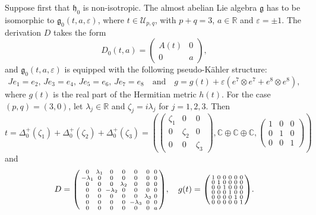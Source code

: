 \documentclass{article}
\theoremstyle{definition}
\newcommand{\R}{\mathbb{R}}
\newcommand{\C}{\mathbb{C}}
\newcommand{\frg}{\mathfrak{g}}
\newcommand{\frh}{\mathfrak{h}}
\newcommand{\lie}[1]{\mathfrak{#1}}
\newcommand{\g}{\lie g}
\newenvironment{smallpmatrix}{\left(\begin{smallmatrix}}{\end{smallmatrix}\right)}
\begin{document}
Suppose first that $\frh_0$ is non-isotropic. The almost abelian Lie algebra $\frg$ has to be isomorphic to $\g_0(t,a,\varepsilon)$, where $t\in\mathcal{U}_{p,q}$, with $p+q=3$, $a\in\R$ and $\varepsilon=\pm1$. The derivation $D$ takes the form $$D_0(t,a)=\begin{pmatrix}
    A(t)&0\\
    0&a
\end{pmatrix},$$ and $\frg_0(t,a,\varepsilon)$ is equipped with the following pseudo-Kähler structure: \begin{equation}\label{eqn:Jgnonisotropic8}
    Je_1=e_2,\,Je_3=e_4,\,Je_5=e_6,\,Je_7=e_8\quad\text{and}\quad g=g(t)+\varepsilon(e^7\otimes e^7+e^8\otimes e^8),
\end{equation} where $g(t)$ is the real part of the Hermitian metric $h(t)$. For the case $(p,q)=(3,0)$, let $\lambda_j\in\R$ and $\zeta_j=i\lambda_j$ for $j=1,2,3$. Then $$t=\Delta_0^+(\zeta_1)+\Delta_0^+(\zeta_2)+\Delta_0^+(\zeta_3)=\left(\begin{pmatrix}
    \zeta_1&0&0\\
    0&\zeta_2&0\\
    0&0&\zeta_3
\end{pmatrix},\C\oplus\C\oplus\C,\begin{pmatrix}
    1&0&0\\
    0&1&0\\
    0&0&1
\end{pmatrix}\right)$$ and \begin{equation}\label{8d_noniso_(3,0)}
    D=\begin{smallpmatrix}
        0 & \lambda_{1} & 0 & 0 & 0 & 0 & 0 \\
        -\lambda_{1} & 0 & 0 & 0 & 0 & 0 & 0 \\
        0 & 0 & 0 & \lambda_{2} & 0 & 0 & 0 \\
        0 & 0 & -\lambda_{2} & 0 & 0 & 0 & 0 \\
        0 & 0 & 0 & 0 & 0 & \lambda_{3} & 0 \\
        0 & 0 & 0 & 0 & -\lambda_{3} & 0 & 0 \\
        0 & 0 & 0 & 0 & 0 & 0 & a
    \end{smallpmatrix},\quad g(t)=\begin{smallpmatrix}
        1 & 0 & 0 & 0 & 0 & 0 \\
        0 & 1 & 0 & 0 & 0 & 0 \\
        0 & 0 & 1 & 0 & 0 & 0 \\
        0 & 0 & 0 & 1 & 0 & 0 \\
        0 & 0 & 0 & 0 & 1 & 0 \\
        0 & 0 & 0 & 0 & 0 & 1
    \end{smallpmatrix}.
\end{equation}
\end{document}
